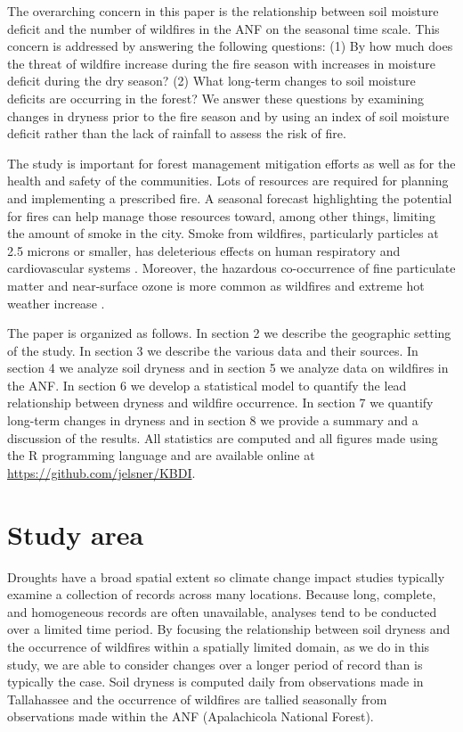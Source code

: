 \documentclass[12pt]{iopart}
\begin{document}
The overarching concern in this paper is the relationship between soil moisture deficit and the number of wildfires in the ANF on the seasonal time scale. This concern is addressed by answering the following questions: (1) By how much does the threat of wildfire increase during the fire season with increases in moisture deficit during the dry season? (2) What long-term changes to soil moisture deficits are occurring in the forest? We answer these questions by examining changes in dryness prior to the fire season and by using an index of soil moisture deficit rather than the lack of rainfall to assess the risk of fire. 

The study is important for forest management mitigation efforts \citep{BeckagePlatt2003} as well as for the health and safety of the communities. Lots of resources are required for planning and implementing a prescribed fire. A seasonal forecast highlighting the potential for fires can help manage those resources toward, among other things, limiting the amount of smoke in the city. Smoke from wildfires, particularly particles at 2.5 microns or smaller, has deleterious effects on human respiratory and cardiovascular systems \citep{Black2017}. Moreover, the hazardous co-occurrence of fine particulate matter and near-surface ozone is more common as wildfires and extreme hot weather increase \citep{KalashnikovEtAl2022}. 

The paper is organized as follows. In section 2 we describe the geographic setting of the study. In section 3 we describe the various data and their sources. In section 4 we analyze soil dryness and in section 5 we analyze data on wildfires in the ANF. In section 6 we develop a statistical model to quantify the lead relationship between dryness and wildfire occurrence. In section 7 we quantify long-term changes in dryness and in section 8 we provide a summary and a discussion of the results. All statistics are computed and all figures made using the R programming language and are available online at \url{https://github.com/jelsner/KBDI}.

\section{Study area}

Droughts have a broad spatial extent so climate change impact studies typically examine a collection of records across many locations. Because long, complete, and homogeneous records are often unavailable, analyses tend to be conducted over a limited time period. By focusing the relationship between soil dryness and the occurrence of wildfires within a spatially limited domain, as we do in this study, we are able to consider changes over a longer period of record than is typically the case. Soil dryness is computed daily from observations made in Tallahassee and the occurrence of wildfires are tallied seasonally from observations made within the ANF (Apalachicola National Forest). 
\end{document}

